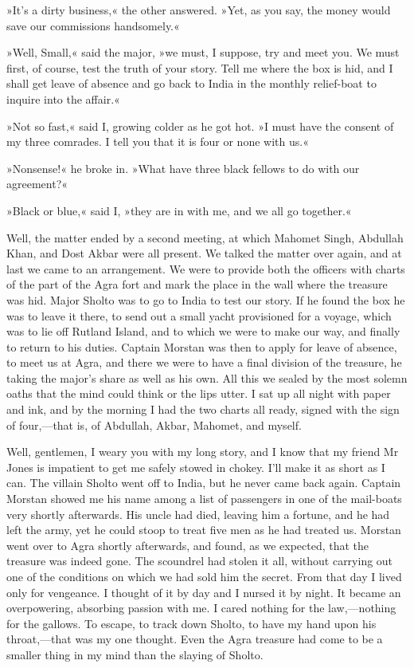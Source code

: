 »It's a dirty business,« the other answered. »Yet, as you say, the money would save our commissions handsomely.«

»Well, Small,« said the major, »we must, I suppose, try and meet you. We must first, of course, test the truth of your story. Tell me where the box is hid, and I shall get leave of absence and go back to India in the monthly relief-boat to inquire into the affair.«

»Not so fast,« said I, growing colder as he got hot. »I must have the consent of my three comrades. I tell you that it is four or none with us.«

»Nonsense!« he broke in. »What have three black fellows to do with our agreement?«

»Black or blue,« said I, »they are in with me, and we all go together.«

Well, the matter ended by a second meeting, at which Mahomet Singh, Abdullah Khan, and Dost Akbar were all present. We talked the matter over again, and at last we came to an arrangement. We were to provide both the officers with charts of the part of the Agra fort and mark the place in the wall where the treasure was hid. Major Sholto was to go to India to test our story. If he found the box he was to leave it there, to send out a small yacht provisioned for a voyage, which was to lie off Rutland Island, and to which we were to make our way, and finally to return to his duties. Captain Morstan was then to apply for leave of absence, to meet us at Agra, and there we were to have a final division of the treasure, he taking the major's share as well as his own. All this we sealed by the most solemn oaths that the mind could think or the lips utter. I sat up all night with paper and ink, and by the morning I had the two charts all ready, signed with the sign of four,—that is, of Abdullah, Akbar, Mahomet, and myself.

Well, gentlemen, I weary you with my long story, and I know that my friend Mr Jones is impatient to get me safely stowed in chokey. I'll make it as short as I can. The villain Sholto went off to India, but he never came back again. Captain Morstan showed me his name among a list of passengers in one of the mail-boats very shortly afterwards. His uncle had died, leaving him a fortune, and he had left the army, yet he could stoop to treat five men as he had treated us. Morstan went over to Agra shortly afterwards, and found, as we expected, that the treasure was indeed gone. The scoundrel had stolen it all, without carrying out one of the conditions on which we had sold him the secret. From that day I lived only for vengeance. I thought of it by day and I nursed it by night. It became an overpowering, absorbing passion with me. I cared nothing for the law,—nothing for the gallows. To escape, to track down Sholto, to have my hand upon his throat,—that was my one thought. Even the Agra treasure had come to be a smaller thing in my mind than the slaying of Sholto.

